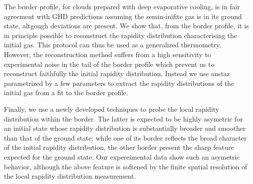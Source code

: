 \documentclass[submission, Phys]{SciPost}
\begin{document}
The border profile, for clouds prepared with deep evaporative cooling, is in fair agreement with GHD predictions assuming the semin-inifite gas is in its ground state, altgough deviations are present. We show that, from the border profile, it is in principle possible to reconstruct the rapidity distribution characterising the initial gas. This protocol can thus be used as a generalized thermometry. 
However, the reconstruction method suffers from a high sensitivity to experimental noise in the tail of the border profile which prevent us to reconstruct faithfully the initial rapidity distribution. Instead we use anstaz parametrized by a few parameters to extract the rapidity distributions of the initial gas from a fit to the border profile. 

Finally, we use a newly developed techniques\cite{dubois_probing_2024} to probe the local rapidity distribution within the border. The latter is expected to be highly asymetric for an initial state whose rapidity distribution is substantially broader and 
smoother than that of the ground state:  while one of its border 
reflects the broad character of the initial rapidity distribution, the other border 
present the sharp feature expected for the ground state.  Our expereimental data show such an asymetric behavior, although the above feature is softened by the finite spatial resolution of the local rapidity distribution measurement.  
\end{document}
